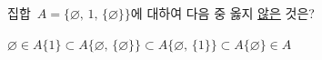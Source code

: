 집합~$A=\{\varnothing,\,1,\,\{\varnothing\}\}$에 대하여 다음 중 옳지 \underline{않은} 것은?
\begin{choices32}{$\varnothing\in A$}{$\{1\}\subset A$}{$\{\varnothing,\,\{\varnothing\}\}\subset A$}{$\{\varnothing,\,\{1\}\}\subset A$}{$\{\varnothing\}\in A$}\end{choices32}
